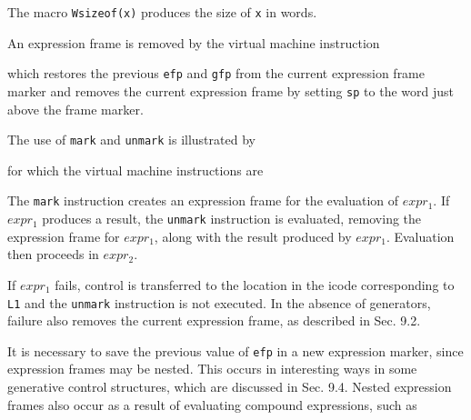 The macro \texttt{Wsizeof(x)} produces the size of \texttt{x} in words.

An expression frame is removed by the virtual machine instruction


\noindent which restores the previous \texttt{efp} and \texttt{gfp}
from the current expression frame marker and removes the current
expression frame by setting \texttt{sp} to the word just above the
frame marker.

The use of \texttt{mark} and \texttt{unmark} is illustrated by


\noindent for which the virtual machine instructions are

\goodbreak
{}


The \texttt{mark} instruction creates an expression frame for the
evaluation of $expr_1$. If $expr_1$ produces a result, the
\texttt{unmark} instruction is evaluated, removing the expression
frame for $expr_1$, along with the result produced by
$expr_1$. Evaluation then proceeds in $expr_2$.

If $expr_1$ fails, control is transferred to the location in the
icode corresponding to \texttt{L1} and the \texttt{unmark} instruction
is not executed. In the absence of generators, failure also removes
the current expression frame, as described in Sec. 9.2.


It is necessary to save the previous value of \texttt{efp} in a new
expression marker, since expression frames may be nested. This occurs
in interesting ways in some generative control structures, which are
discussed in Sec. 9.4. Nested expression frames also occur as a result
of evaluating compound expressions, such as

